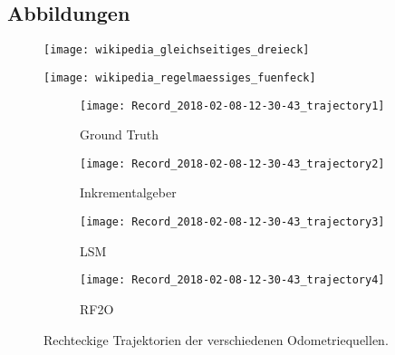 %
%
%
\begin{appendices}


%
%
%
\chapter{Abbildungen}


\begin{figure}[h!]
	\centering
	\texttt{[image: wikipedia\_gleichseitiges\_dreieck]}
	\label{fig:wikipedia_gleichseitiges_dreieck}
\end{figure}



\begin{figure}[h!]
	\centering
	\texttt{[image: wikipedia\_regelmaessiges\_fuenfeck]}
	\label{fig:wikipedia_regelmaessiges_fuenfeck}
\end{figure}



\begin{figure}[h!]
	\centering
	\begin{subfigure}{0.49\linewidth}
		\centering
		\texttt{[image: Record\_2018-02-08-12-30-43\_trajectory1]}
		\caption{Ground Truth}
		\label{fig:Record_2018-02-08-12-30-43_trajectory1}
	\end{subfigure}
	\hfill
	\begin{subfigure}{0.49\linewidth}
		\centering
		\texttt{[image: Record\_2018-02-08-12-30-43\_trajectory2]}
		\caption{Inkrementalgeber}
		\label{fig:Record_2018-02-08-12-30-43_trajectory2}
	\end{subfigure}
	\par
	\bigskip
	\begin{subfigure}{0.49\linewidth}
		\centering
		\texttt{[image: Record\_2018-02-08-12-30-43\_trajectory3]}
		\caption{LSM}
		\label{fig:Record_2018-02-08-12-30-43_trajectory3}
	\end{subfigure}
	\hfill
	\begin{subfigure}{0.49\linewidth}
		\centering
		\texttt{[image: Record\_2018-02-08-12-30-43\_trajectory4]}
		\caption{RF2O}
		\label{fig:Record_2018-02-08-12-30-43_trajectory4}
	\end{subfigure}
	\caption{Rechteckige Trajektorien der verschiedenen Odometriequellen.}
	\label{fig:Record_2018-02-08-12-30-43_trajectory}
\end{figure}



\end{appendices}
